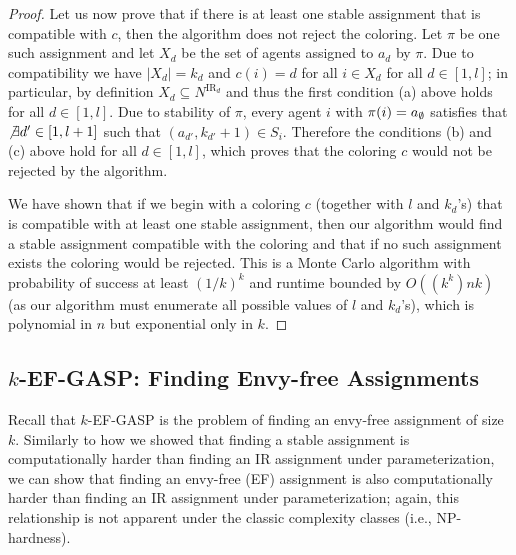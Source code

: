 \begin{proof}
Let us now prove that if there is at least one stable assignment that is compatible with $c$, then the algorithm does not reject the coloring. 
Let $\pi$ be one such assignment and let $X_d$ be the set of agents assigned to $a_d$ by $\pi$. Due to compatibility we have $|X_d| = k_d$ and $c(i) = d$ for all $i \in X_d$ for all $d\in [1, l]$; in particular, by definition $X_d \subseteq N^{\text{IR}_d}$ and thus the first condition (a) above holds for all $d\in [1, l]$. Due to stability of $\pi$, every agent $i$ with $\pi(i) = a_{\emptyset}$ satisfies that $\not\exists d'\in [1, l+1]$ such that $(a_{d'}, k_{d'}+1) \in S_i$. Therefore the conditions (b) and (c) above hold for all $d\in [1, l]$, which proves that the coloring $c$ would not be rejected by the algorithm.

We have shown that if we begin with a coloring $c$ (together with $l$ and $k_d$'s) that is compatible with at least one stable assignment, then our algorithm would find a stable assignment compatible with the coloring and that if no such assignment exists the coloring would be rejected. This is a Monte Carlo algorithm with probability of success at least $(1/k)^k$ and runtime bounded by $O((k^k)nk)$ (as our algorithm must enumerate all possible values of $l$ and $k_d$'s), which is polynomial in $n$ but exponential only in $k$. 
\end{proof}


\subsection{$k$-EF-GASP: Finding Envy-free Assignments}
Recall that $k$-EF-GASP is the problem of finding an envy-free assignment of size $k$. 
Similarly to how we showed that finding a stable assignment is computationally harder than finding an IR assignment under parameterization, we can show that finding an envy-free (EF) assignment is also computationally harder than finding an IR assignment under parameterization; again, this relationship is not apparent under the classic complexity classes (i.e., NP-hardness).

